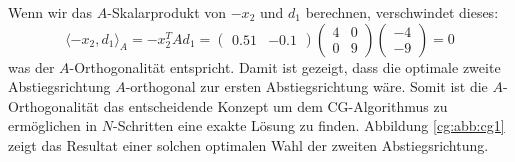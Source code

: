 Wenn wir das $A$-Skalarprodukt von $-x_2$ und $d_1$ berechnen, verschwindet dieses:
\begin{equation}
	\langle -x_2 , d_1 \rangle_A = 	-x_2^T A d_1 = 
		\begin{pmatrix} 0.51 & -0.1 \end{pmatrix} 
		\begin{pmatrix} 4 & 0\\
						0 & 9 
		\end{pmatrix} 
		\begin{pmatrix} -4\\
						-9 
		\end{pmatrix} = 0 \nonumber
\end{equation}
was der $A$-Orthogonalität entspricht.
Damit ist gezeigt, dass die optimale zweite Abstiegsrichtung $A$-orthogonal zur ersten Abstiegsrichtung wäre.
Somit ist die $A$-Orthogonalität das entscheidende Konzept um dem CG-Algorithmus zu ermöglichen in $N$-Schritten eine exakte Lösung zu finden.
Abbildung \ref{cg:abb:cg1} zeigt das Resultat einer solchen optimalen Wahl der zweiten Abstiegsrichtung.